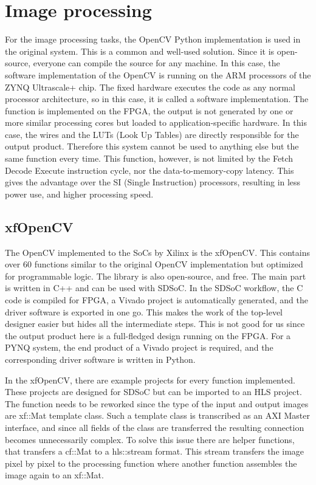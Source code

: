 \section{Image processing} %
For the image processing tasks, the OpenCV Python implementation is used in the original system.
This is a common and well-used solution.
Since it is open-source, everyone can compile the source for any machine.
In this case, the software implementation of the OpenCV is running on the ARM processors of the ZYNQ Ultrascale+ chip.
The fixed hardware executes the code as any normal processor architecture, so in this case, it is called a software implementation.
The function is implemented on the FPGA, the output is not generated by one or more similar processing cores but loaded to application-specific hardware.
In this case, the wires and the LUTs (Look Up Tables) are directly responsible for the output product.
Therefore this system cannot be used to anything else but the same function every time.
This function, however, is not limited by the Fetch Decode Execute instruction cycle, nor the data-to-memory-copy latency.
This gives the advantage over the SI (Single Instruction) processors, resulting in less power use, and higher processing speed.

\subsection{xfOpenCV} %
The OpenCV implemented to the SoCs by Xilinx is the xfOpenCV.
This contains over 60 functions similar to the original OpenCV implementation but optimized for programmable logic.
The library is also open-source, and free.
The main part is written in C++ and can be used with SDSoC.
In the SDSoC workflow, the C code is compiled for FPGA, a Vivado project is automatically generated, and the driver software is exported in one go.
This makes the work of the top-level designer easier but hides all the intermediate steps.
This is not good for us since the output product here is a full-fledged design running on the FPGA.
For a PYNQ system, the end product of a Vivado project is required, and the corresponding driver software is written in Python.

In the xfOpenCV, there are example projects for every function implemented.
These projects are designed for SDSoC but can be imported to an HLS project.
The function needs to be reworked since the type of the input and output images are xf::Mat template class.
Such a template class is transcribed as an AXI Master interface, and since all fields of the class are transferred the resulting connection becomes unnecessarily complex.
To solve this issue there are helper functions, that transfers a cf::Mat to a hls::stream format.
This stream transfers the image pixel by pixel to the processing function where another function assembles the image again to an xf::Mat.

